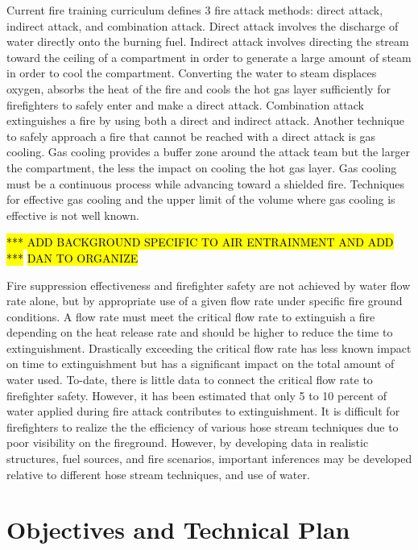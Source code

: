 \documentclass{article}
\begin{document}
Current fire training curriculum defines 3 fire attack methods: direct attack, indirect attack, and combination attack. Direct attack involves the discharge of water directly onto the burning fuel. Indirect attack involves directing the stream toward the ceiling of a compartment in order to generate a large amount of steam in order to cool the compartment. Converting the water to steam displaces oxygen, absorbs the heat of the fire and cools the hot gas layer sufficiently for firefighters to safely enter and make a direct attack. Combination attack extinguishes a fire by using both a direct and indirect attack. Another technique to safely approach a fire that cannot be reached with a direct attack is gas cooling. Gas cooling provides a buffer zone around the attack team but the larger the compartment, the less the impact on cooling the hot gas layer. Gas cooling must be a continuous process while advancing toward a shielded fire. Techniques for effective gas cooling and the upper limit of the volume where gas cooling is effective is not well known.  

\hl{*** ADD BACKGROUND SPECIFIC TO AIR ENTRAINMENT AND ADD ***}
\hl{DAN TO ORGANIZE}

Fire suppression effectiveness and firefighter safety are not achieved by water flow rate alone, but by appropriate use of a given flow rate under specific fire ground conditions. A flow rate must meet the critical flow rate to extinguish a fire depending on the heat release rate and should be higher to reduce the time to extinguishment. Drastically exceeding the critical flow rate has less known impact on time to extinguishment but has a significant impact on the total amount of water used. To-date, there is little data to connect the critical flow rate to firefighter safety. However, it has been estimated that only 5 to 10 percent of water applied during fire attack contributes to extinguishment. It is difficult for firefighters to realize the the efficiency of various hose stream techniques due to poor visibility on the fireground. However, by developing data in realistic structures, fuel sources, and fire scenarios, important inferences may be developed relative to different hose stream techniques, and use of water.

\clearpage

\section{Objectives and Technical Plan}
\end{document}
